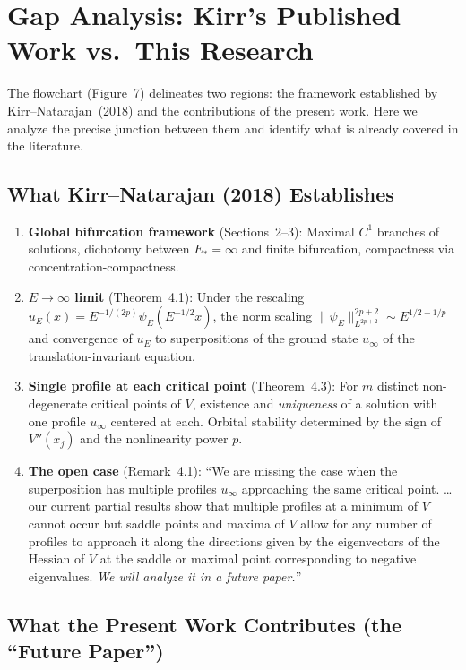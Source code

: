 \documentclass[11pt]{article}
\begin{document}
\section{Gap Analysis: Kirr's Published Work vs.\ This Research}

The flowchart (Figure~7) delineates two regions: the framework established by Kirr--Natarajan~(2018) and the contributions of the present work. Here we analyze the precise junction between them and identify what is already covered in the literature.

\subsection{What Kirr--Natarajan (2018) Establishes}

\begin{enumerate}[nosep]
  \item \textbf{Global bifurcation framework} (Sections~2--3): Maximal $C^1$ branches of solutions, dichotomy between $E_*=\infty$ and finite bifurcation, compactness via concentration-compactness.
  \item \textbf{$E\to\infty$ limit} (Theorem~4.1): Under the rescaling $u_E(x) = E^{-1/(2p)}\psi_E(E^{-1/2}x)$, the norm scaling $\|\psi_E\|_{L^{2p+2}}^{2p+2}\sim E^{1/2+1/p}$ and convergence of $u_E$ to superpositions of the ground state $u_\infty$ of the translation-invariant equation.
  \item \textbf{Single profile at each critical point} (Theorem~4.3): For $m$ distinct non-degenerate critical points of $V$, existence and \emph{uniqueness} of a solution with one profile $u_\infty$ centered at each. Orbital stability determined by the sign of $V''(x_j)$ and the nonlinearity power $p$.
  \item \textbf{The open case} (Remark~4.1): ``We are missing the case when the superposition has multiple profiles $u_\infty$ approaching the same critical point. \ldots our current partial results show that multiple profiles at a minimum of $V$ cannot occur but saddle points and maxima of $V$ allow for any number of profiles to approach it along the directions given by the eigenvectors of the Hessian of $V$ at the saddle or maximal point corresponding to negative eigenvalues. \emph{We will analyze it in a future paper.}''
\end{enumerate}

\subsection{What the Present Work Contributes (the ``Future Paper'')}
\end{document}
